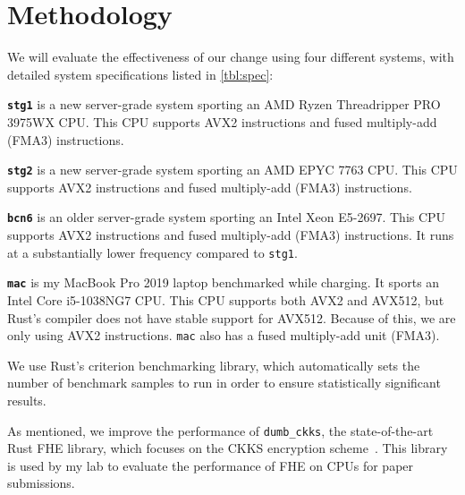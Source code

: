 \section{Methodology}

\tblSpecs

We will evaluate the effectiveness of our change using four different systems,
with detailed system specifications listed in \autoref{tbl:spec}:

\textbf{\texttt{stg1}} is a new server-grade system sporting an AMD Ryzen
Threadripper PRO 3975WX CPU. This CPU supports AVX2 instructions and fused
multiply-add (FMA3) instructions.

\textbf{\texttt{stg2}} is a new server-grade system sporting an AMD EPYC 7763 CPU.
This CPU supports AVX2 instructions and fused multiply-add (FMA3) instructions.

\textbf{\texttt{bcn6}} is an older server-grade system sporting an Intel Xeon
E5-2697.
This CPU supports AVX2 instructions and fused multiply-add (FMA3) instructions.
It runs at a substantially lower frequency compared to \texttt{stg1}.

\textbf{\texttt{mac}} is my MacBook Pro 2019 laptop benchmarked while charging.
It sports an Intel Core i5-1038NG7 CPU. This CPU supports both AVX2 and AVX512,
but Rust's compiler does not have stable support for AVX512. Because of this,
we are only using AVX2 instructions.
\texttt{mac} also has a fused multiply-add unit (FMA3).

We use Rust's criterion benchmarking library, which automatically sets the
number of benchmark samples to run in order to ensure statistically significant
results.

As mentioned, we improve the performance of \verb!dumb_ckks!, the
state-of-the-art Rust FHE library, which focuses on the CKKS encryption
scheme~\cite{cheon:asiacrypt17:ckks}.
This library is used by my lab to evaluate the performance of FHE on CPUs for
paper submissions.
